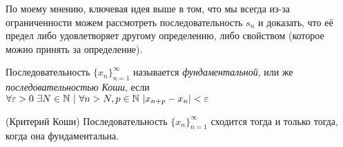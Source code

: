 \begin{anote}
	По моему мнению, ключевая идея выше в том, что мы всегда из-за ограниченности можем рассмотреть последовательность $s_n$ и доказать, что её предел либо удовлетворяет другому определению, либо свойством (которое можно принять за определение).
\end{anote}

\begin{definition}
	Последовательность $\{x_n\}_{n = 1}^\infty$ называется \textit{фундаментальной}, или же \textit{последовательностью Коши}, если $\forall \varepsilon > 0\ \exists N \in \mathbb{N}\ |\ \forall n > N, p \in \mathbb{N}\ |x_{n + p} - x_n| < \varepsilon$
\end{definition}

\begin{theorem} (Критерий Коши)
	Последовательность $\{x_n\}_{n = 1}^\infty$ сходится тогда и только тогда, когда она фундаментальна. 
\end{theorem}

